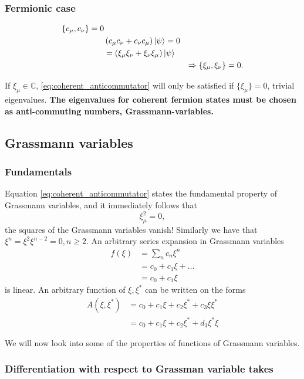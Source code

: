 \subsubsection{Fermionic case}
\begin{align}
\{c_\mu, c_\nu\} = 0 && \nonumber \\
&\left(c_\mu c_\nu + c_\nu c_\mu\right)\ket{\psi} = 0 &\nonumber \\
&=\left(\xi_\mu\xi_\nu + \xi_\nu\xi_\mu\right)\ket{\psi} &\nonumber \\
&&\Rightarrow \{\xi_\mu,\xi_\nu\} = 0.\label{eq:coherent_anticommutator}
\end{align}

If $\xi_\mu\in\mathbb{C}$, \eqref{eq:coherent_anticommutator} will only be satisfied if $\{\xi_\mu\} = 0$, trivial eigenvalues. \textbf{The eigenvalues for coherent fermion states must be chosen as anti-commuting numbers, Grassmann-variables.}

\subsection{Grassmann variables}
\subsubsection{Fundamentals}

Equation \eqref{eq:coherent_anticommutator} states the fundamental property of Grassmann variables, and it immediately follows that 
\begin{equation}
\xi_\mu^2 = 0,
\end{equation}
the squares of the Grassmann variables vanish!
Similarly we have that $\xi^n = \xi^2\xi^{n-2} = 0, n \ge 2$.
An arbitrary series expansion in Grassmann variables
\begin{align}
f(\xi) &= \sum_nc_n\xi^n \nonumber \\
&=c_0 + c_1\xi + \dots \nonumber\\
&= c_0 + c_1\xi
\end{align}
is linear.
An arbitrary function of $\xi, \xi^*$ can be written on the forms
\begin{align*}
A\left(\xi, \xi^*\right) &= c_0 + c_1\xi + c_2\xi^*+c_3\xi\xi^* \\
&= c_0 + c_1\xi + c_2\xi^*+d_3\xi^*\xi
\end{align*}

We will now look into some of the properties of functions of Grassmann variables.
\subsubsection{Differentiation with respect to Grassman variable takes}
